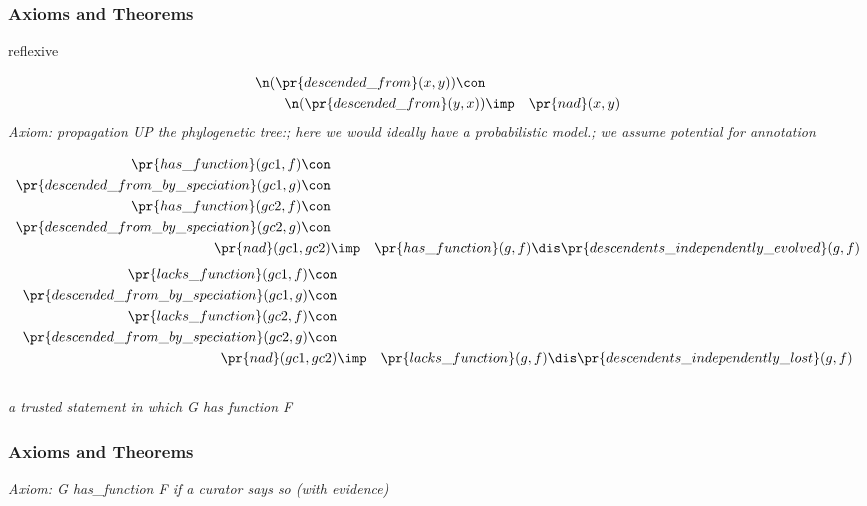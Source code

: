 \subsubsection*{Axioms and Theorems}
\begin{clist}
\item reflexive
\end{clist}

\begin{eqnarray*}
 \n( \pr{descended\_from}(x, y) )\con \\
 \n( \pr{descended\_from}(y, x) )&\imp & \pr{nad}(x, y) 
\end{eqnarray*}
\emph{Axiom: propagation UP the phylogenetic tree:; here we would ideally have a probabilistic model.; we assume potential for annotation }

\begin{eqnarray*}
 \pr{has\_function}(gc1, f) \con \\
 \pr{descended\_from\_by\_speciation}(gc1, g) \con \\
 \pr{has\_function}(gc2, f) \con \\
 \pr{descended\_from\_by\_speciation}(gc2, g) \con \\
 \pr{nad}(gc1, gc2) &\imp & \pr{has\_function}(g, f) \dis  \pr{descendents\_independently\_evolved}(g, f) 
\end{eqnarray*}
\begin{eqnarray*}
 \pr{lacks\_function}(gc1, f) \con \\
 \pr{descended\_from\_by\_speciation}(gc1, g) \con \\
 \pr{lacks\_function}(gc2, f) \con \\
 \pr{descended\_from\_by\_speciation}(gc2, g) \con \\
 \pr{nad}(gc1, gc2) &\imp & \pr{lacks\_function}(g, f) \dis  \pr{descendents\_independently\_lost}(g, f) 
\end{eqnarray*}
\subsection*{ }
\emph{a trusted statement in which G has function F}

\subsubsection*{Axioms and Theorems}

\emph{Axiom: G has\_function F if a curator says so (with evidence)}

